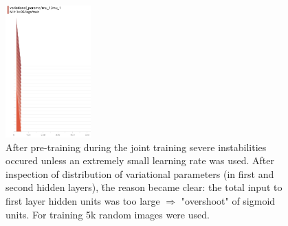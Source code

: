\begin{figure}[h]
\begin{mdframed}
\quad
\includegraphics[height=2in]{dbm-cifar/mu_1_before.png}
\caption{After pre-training during the joint training severe instabilities occured unless an extremely small learning rate was used. After inspection of distribution of variational parameters (in first and second hidden layers), \u{the reason became clear}: the total input to first layer hidden units was too large $\Rightarrow$ "overshoot" of sigmoid units. For training 5k random images were used.}
\end{mdframed}
\end{figure}

\clearpage


